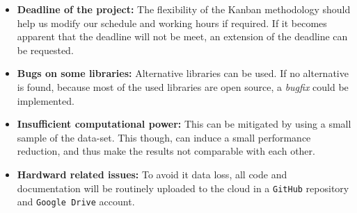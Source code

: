 \begin{itemize}
    \item \textbf{Deadline of the project:} The flexibility of the Kanban methodology should help us modify our schedule and working hours if required. If it becomes apparent that the deadline will not be meet, an extension of the deadline can be requested.
    \item \textbf{Bugs on some libraries:} Alternative libraries can be used. If no alternative is found, because most of the used libraries are open source, a \emph{bugfix} could be implemented.
    \item \textbf{Insufficient computational power:} This can be mitigated by using a small sample of the data-set. This though, can induce a small performance reduction, and thus make the results not comparable with each other. 
    \item \textbf{Hardward related issues:} To avoid it data loss, all code and documentation will be routinely uploaded to the cloud in a \texttt{GitHub} repository and \texttt{Google Drive} account.
\end{itemize}





